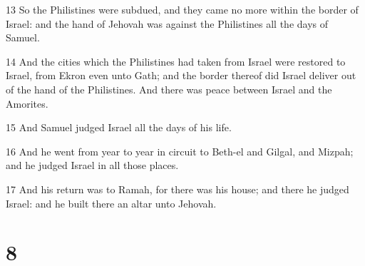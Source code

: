 \par 13 So the Philistines were subdued, and they came no more within the border of Israel: and the hand of Jehovah was against the Philistines all the days of Samuel.
\par 14 And the cities which the Philistines had taken from Israel were restored to Israel, from Ekron even unto Gath; and the border thereof did Israel deliver out of the hand of the Philistines. And there was peace between Israel and the Amorites.
\par 15 And Samuel judged Israel all the days of his life.
\par 16 And he went from year to year in circuit to Beth-el and Gilgal, and Mizpah; and he judged Israel in all those places.
\par 17 And his return was to Ramah, for there was his house; and there he judged Israel: and he built there an altar unto Jehovah.

\chapter{8}

